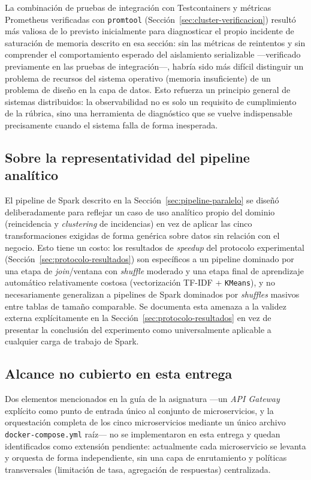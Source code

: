 \documentclass[11pt,letterpaper]{article}
\begin{document}
La combinación de pruebas de integración con Testcontainers y métricas Prometheus verificadas con
\texttt{promtool} (Sección~\ref{sec:cluster-verificacion}) resultó más valiosa de lo previsto
inicialmente para diagnosticar el propio incidente de saturación de memoria descrito en esa
sección: sin las métricas de reintentos y sin comprender el comportamiento esperado del aislamiento
serializable —verificado previamente en las pruebas de integración—, habría sido más difícil
distinguir un problema de recursos del sistema operativo (memoria insuficiente) de un problema de
diseño en la capa de datos. Esto refuerza un principio general de sistemas distribuidos: la
observabilidad no es solo un requisito de cumplimiento de la rúbrica, sino una herramienta de
diagnóstico que se vuelve indispensable precisamente cuando el sistema falla de forma inesperada.

\subsection{Sobre la representatividad del pipeline analítico}

El pipeline de Spark descrito en la Sección~\ref{sec:pipeline-paralelo} se diseñó deliberadamente
para reflejar un caso de uso analítico propio del dominio (reincidencia y \emph{clustering} de
incidencias) en vez de aplicar las cinco transformaciones exigidas de forma genérica sobre datos
sin relación con el negocio. Esto tiene un costo: los resultados de \emph{speedup} del protocolo
experimental (Sección~\ref{sec:protocolo-resultados}) son específicos a un pipeline dominado por
una etapa de \emph{join}/ventana con \emph{shuffle} moderado y una etapa final de aprendizaje
automático relativamente costosa (vectorización TF-IDF + \texttt{KMeans}), y no necesariamente
generalizan a pipelines de Spark dominados por \emph{shuffles} masivos entre tablas de tamaño
comparable. Se documenta esta amenaza a la validez externa explícitamente en la
Sección~\ref{sec:protocolo-resultados} en vez de presentar la conclusión del experimento como
universalmente aplicable a cualquier carga de trabajo de Spark.

\subsection{Alcance no cubierto en esta entrega}

Dos elementos mencionados en la guía de la asignatura —un \emph{API Gateway} explícito como punto
de entrada único al conjunto de microservicios, y la orquestación completa de los cinco
microservicios mediante un único archivo \texttt{docker-compose.yml} raíz— no se implementaron en
esta entrega y quedan identificados como extensión pendiente: actualmente cada microservicio se
levanta y orquesta de forma independiente, sin una capa de enrutamiento y políticas transversales
(limitación de tasa, agregación de respuestas) centralizada.
\end{document}
